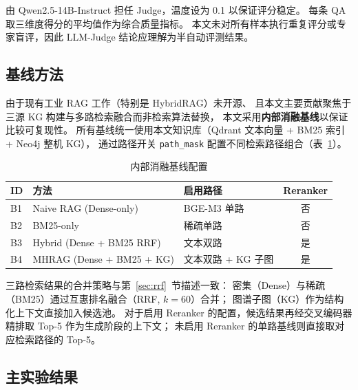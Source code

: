 由 Qwen2.5-14B-Instruct 担任 Judge，温度设为 0.1 以保证评分稳定。
每条 QA 取三维度得分的平均值作为综合质量指标。
本文未对所有样本执行重复评分或专家盲评，因此 LLM-Judge 结论应理解为半自动评测结果。

\subsection{基线方法}
\label{sec:exp-baselines}

由于现有工业 RAG 工作（特别是 HybridRAG\cite{shen2025hybridrag}）未开源、
且本文主要贡献聚焦于三源 KG 构建与多路检索融合而非检索算法替换，
本文采用\textbf{内部消融基线}以保证比较可复现性。
所有基线统一使用本文知识库（Qdrant 文本向量 + BM25 索引 + Neo4j 整机 KG），
通过路径开关 \texttt{path\_mask} 配置不同检索路径组合（表~\ref{tab:baselines}）。

\begin{table}[htbp]
  \centering
  \caption{内部消融基线配置}
  \label{tab:baselines}
  \renewcommand{\arraystretch}{1.3}
  \begin{tabularx}{\linewidth}{llXc}
    \toprule
    \textbf{ID} & \textbf{方法} & \textbf{启用路径} & \textbf{Reranker} \\
    \midrule
    B1 & Naive RAG (Dense-only)        & BGE-M3 单路       & 否 \\
    B2 & BM25-only                     & 稀疏单路           & 否 \\
    B3 & Hybrid (Dense + BM25 RRF)     & 文本双路           & 是 \\
    B4 & MHRAG (Dense + BM25 + KG)     & 文本双路 + KG 子图 & 是 \\
    \bottomrule
  \end{tabularx}
\end{table}

三路检索结果的合并策略与第~\ref{sec:rrf}~节描述一致：
密集（Dense）与稀疏（BM25）通过互惠排名融合（RRF, $k=60$）合并；
图谱子图（KG）作为结构化上下文直接加入候选池。
对于启用 Reranker 的配置，候选结果再经交叉编码器精排取 Top-5 作为生成阶段的上下文；
未启用 Reranker 的单路基线则直接取对应检索路径的 Top-5。

\subsection{主实验结果}
\label{sec:exp-main}


